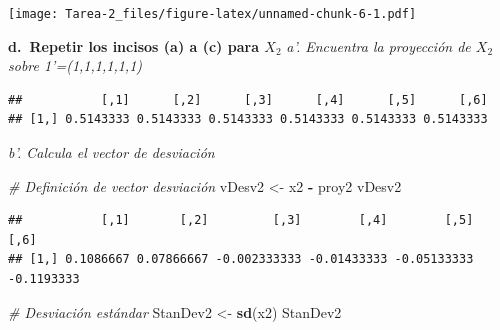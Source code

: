 \documentclass[
]{article}
\newenvironment{Shaded}{\begin{snugshade}}{\end{snugshade}}
\newcommand{\CommentTok}[1]{\textcolor[rgb]{0.56,0.35,0.01}{\textit{#1}}}
\newcommand{\FloatTok}[1]{\textcolor[rgb]{0.00,0.00,0.81}{#1}}
\newcommand{\KeywordTok}[1]{\textcolor[rgb]{0.13,0.29,0.53}{\textbf{#1}}}
\newcommand{\NormalTok}[1]{#1}
\newcommand{\OperatorTok}[1]{\textcolor[rgb]{0.81,0.36,0.00}{\textbf{#1}}}
\newcommand{\StringTok}[1]{\textcolor[rgb]{0.31,0.60,0.02}{#1}}
\begin{document}
\texttt{[image: Tarea-2\_files/figure-latex/unnamed-chunk-6-1.pdf]}

\textbf{d.~Repetir los incisos (a) a (c) para \(X_2\)} \emph{a'.
Encuentra la proyección de \(X_2\) sobre 1'=(1,1,1,1,1,1)}

\begin{Shaded}
\end{Shaded}

\begin{verbatim}
##           [,1]      [,2]      [,3]      [,4]      [,5]      [,6]
## [1,] 0.5143333 0.5143333 0.5143333 0.5143333 0.5143333 0.5143333
\end{verbatim}

\emph{b'. Calcula el vector de desviación}

\begin{Shaded}
\begin{Highlighting}[]
  \CommentTok{# Definición de vector desviación}
\NormalTok{  vDesv2 <-}\StringTok{ }\NormalTok{x2 }\OperatorTok{-}\StringTok{ }\NormalTok{proy2}
\NormalTok{  vDesv2}
\end{Highlighting}
\end{Shaded}

\begin{verbatim}
##           [,1]       [,2]         [,3]        [,4]        [,5]       [,6]
## [1,] 0.1086667 0.07866667 -0.002333333 -0.01433333 -0.05133333 -0.1193333
\end{verbatim}

\begin{Shaded}
\begin{Highlighting}[]
  \CommentTok{# Desviación estándar}
\NormalTok{  StanDev2 <-}\StringTok{ }\KeywordTok{sd}\NormalTok{(x2)}
\NormalTok{  StanDev2}
\end{Highlighting}
\end{Shaded}
\end{document}
